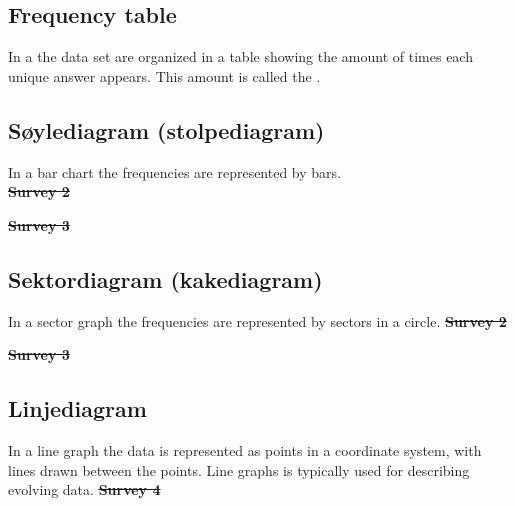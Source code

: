 \subsection{Frequency table}
In a  the data set are organized in a table showing the amount of times each unique answer appears. This amount is called the .\regv

\newpage
\subsection{Søylediagram (stolpediagram)}
In a bar chart the frequencies are represented by bars. \\[8pt]
\st{ \label{soylund2}
\textbf{Survey 2}
} \vsk

\st{
\textbf{Survey 3}
}
\newpage
\subsection{Sektordiagram (kakediagram)}
In a sector graph the frequencies are represented by sectors in a circle. \regv
\st{  \label{sektorund2}
\textbf{Survey 2}
} \vsk

\st{ \label{sektorundsk3}
\textbf{Survey 3}	
} \vsk

\newpage
\subsection{Linjediagram}
In a line graph the data is represented as points in a coordinate system, with lines drawn between the points. Line graphs is typically used for describing evolving data.
\regv
\st{
\textbf{Survey 4} \\
}
